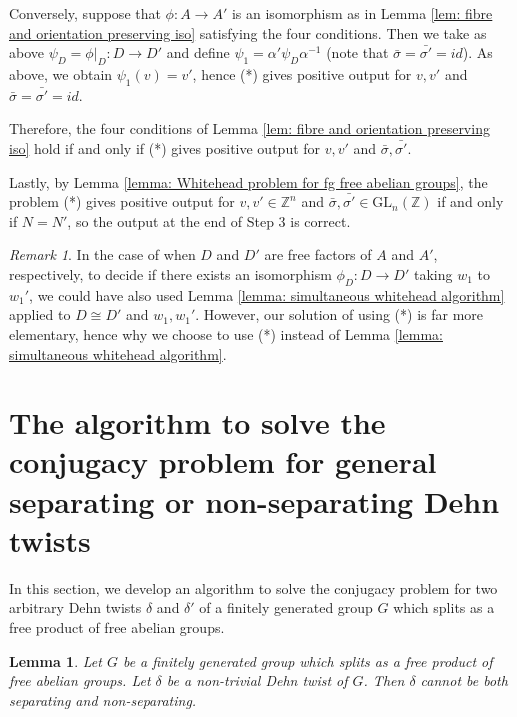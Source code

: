\documentclass{amsart}
\newcommand{\Z}{\mathbb{Z}}
\theoremstyle{plain}
\newtheorem{lemma}[thm]{Lemma}
\theoremstyle{definition}
\theoremstyle{remark}
\newtheorem{rmk}[thm]{Remark}
\begin{document}
Conversely, suppose that $\phi : A \to A'$ is an isomorphism as in Lemma \ref{lem: fibre and orientation preserving iso} satisfying the four conditions. Then we take as above $\psi_D = \phi|_D : D \to D'$ and define $\psi_1 = \alpha' \psi_D \alpha^{-1}$ (note that $\bar{\sigma} = \bar{\sigma'} = id$). As above, we obtain $\psi_1(v) = v'$, hence (*) gives positive output for $v,v'$ and $\bar{\sigma} = \bar{\sigma'} = id$.

Therefore, the four conditions of Lemma \ref{lem: fibre and orientation preserving iso} hold if and only if (*) gives positive output for $v,v'$ and $\bar{\sigma}, \bar{\sigma'}$. 

Lastly, by Lemma \ref{lemma: Whitehead problem for fg free abelian groups}, the problem (*) gives positive output for $v,v' \in \Z^n$ and $\bar{\sigma}, \bar{\sigma'} \in \mathrm{GL}_n(\Z)$ if and only if $N = N'$, so the output at the end of Step 3 is correct. 

\begin{rmk}
    \label{rmk: Using generalized whitehead also works}
    In the case of when $D$ and $D'$ are free factors of $A$ and $A'$, respectively, to decide if there exists an isomorphism $\phi_D : D \to D'$ taking $w_1$ to $w_1'$, we could have also used Lemma \ref{lemma: simultaneous whitehead algorithm} applied to $D \cong D'$ and $w_1, w_1'$. However, our solution of using (*) is far more elementary, hence why we choose to use (*) instead of Lemma \ref{lemma: simultaneous whitehead algorithm}.
\end{rmk}

\section{The algorithm to solve the conjugacy problem for general separating or non-separating Dehn twists}

In this section, we develop an algorithm to solve the conjugacy problem for two arbitrary Dehn twists $\delta$ and $\delta'$ of a finitely generated group $G$ which splits as a free product of free abelian groups. 



\begin{lemma}
    \label{lemma: Dehn twists cannot be both separating and non-separating}
    Let $G$ be a finitely generated group which splits as a free product of free abelian groups. Let $\delta$ be a non-trivial Dehn twist of $G$. Then $\delta$ cannot be both separating and non-separating. 
\end{lemma}
\end{document}
